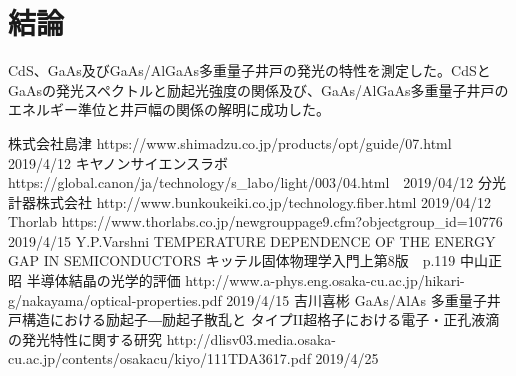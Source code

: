 \documentclass[11pt,a4j]{jsarticle}
\begin{document}
\newpage
\section{結論}
CdS、GaAs及びGaAs/AlGaAs多重量子井戸の発光の特性を測定した。CdSとGaAsの発光スペクトルと励起光強度の関係及び、GaAs/AlGaAs多重量子井戸のエネルギー準位と井戸幅の関係の解明に成功した。

\begin{thebibliography}{9}
 株式会社島津 https://www.shimadzu.co.jp/products/opt/guide/07.html 2019/4/12
  キヤノンサイエンスラボ https://global.canon/ja/technology/s\_labo/light/003/04.html　2019/04/12
  分光計器株式会社 http://www.bunkoukeiki.co.jp/technology.fiber.html 2019/04/12
 Thorlab\,\,https://www.thorlabs.co.jp/newgrouppage9.cfm?objectgroup\_id=10776 2019/4/15
 Y.P.Varshni TEMPERATURE DEPENDENCE OF THE ENERGY GAP IN SEMICONDUCTORS
 キッテル固体物理学入門上第8版　p.119
 中山正昭 半導体結晶の光学的評価 http://www.a-phys.eng.osaka-cu.ac.jp/hikari-g/nakayama/optical-properties.pdf 2019/4/15
 吉川喜彬 GaAs/AlAs 多重量子井戸構造における励起子―励起子散乱と
 タイプII超格子における電子・正孔液滴の発光特性に関する研究 http://dlisv03.media.osaka-cu.ac.jp/contents/osakacu/kiyo/111TDA3617.pdf 2019/4/25

\end{thebibliography}
\end{document}
